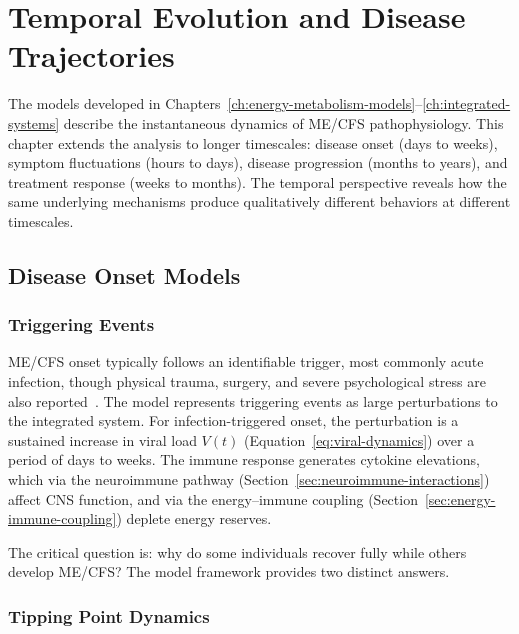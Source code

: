 \chapter{Temporal Evolution and Disease Trajectories}
\label{ch:temporal-evolution}

The models developed in Chapters~\ref{ch:energy-metabolism-models}--\ref{ch:integrated-systems} describe the instantaneous dynamics of ME/CFS pathophysiology. This chapter extends the analysis to longer timescales: disease onset (days to weeks), symptom fluctuations (hours to days), disease progression (months to years), and treatment response (weeks to months). The temporal perspective reveals how the same underlying mechanisms produce qualitatively different behaviors at different timescales.



\section{Disease Onset Models}
\label{sec:disease-onset-models}

\subsection{Triggering Events}
\label{sec:triggering-events}

ME/CFS onset typically follows an identifiable trigger, most commonly acute infection, though physical trauma, surgery, and severe psychological stress are also reported~\cite{Chu2019}. The model represents triggering events as large perturbations to the integrated system. For infection-triggered onset, the perturbation is a sustained increase in viral load $V(t)$ (Equation~\ref{eq:viral-dynamics}) over a period of days to weeks. The immune response generates cytokine elevations, which via the neuroimmune pathway (Section~\ref{sec:neuroimmune-interactions}) affect CNS function, and via the energy--immune coupling (Section~\ref{sec:energy-immune-coupling}) deplete energy reserves.

The critical question is: why do some individuals recover fully while others develop ME/CFS? The model framework provides two distinct answers.

\subsection{Tipping Point Dynamics}
\label{sec:tipping-point}

